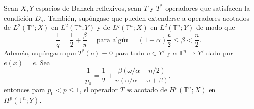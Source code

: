 \begin{theorem}
	Sean $X, Y$ espacios de Banach reflexivos, sean $T$ y  $T^*$ operadores que satisfacen la condición $D_\alpha$. También, supóngase que pueden extenderse a operadores acotados de $L^2(\mathbb{T}^n;X)$ en $L^2(\mathbb{T}^n;Y)$ y de $L^q(\mathbb{T}^n;X)$ en $L^2(\mathbb{T}^n;Y)$ de modo que 
	\begin{equation}
		\frac{1}{q} = \frac{1}{2} + \frac{\beta}{n} \quad \text{ para algún } \quad (1-\alpha)\frac{n}{2}\leq \beta<\frac{n}{2}.
	\end{equation}
	Además, supóngase que $T^*(\overline{e})=0$ para todo ${e}\in Y'$ y $\overline{e}:\mathbb{T}^n\rightarrow Y'$ dado por $\overline{e}(x)=e$. Sea 
	\begin{equation}
		\frac{1}{p_0}=\frac{1}{2} + \frac{\beta(\omega/\alpha+n/2)}{n(\omega/\alpha - \omega +\beta)},
	\end{equation}
	entonces para $p_0<p\leq1$, el operador $T$ es acotado de $H^p(\mathbb{T}^n;X)$ en $H^p(\mathbb{T}^n;Y)$.
	\label{theo:Hp-operator}
\end{theorem}


